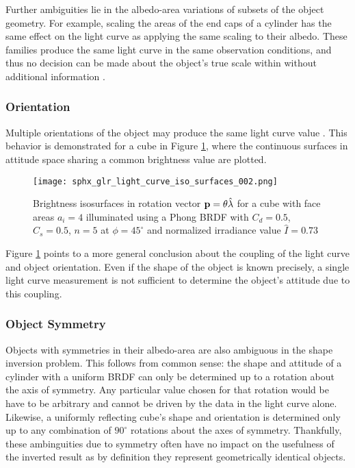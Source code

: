 Further ambiguities lie in the albedo-area variations of subsets of the object geometry. For example, scaling the areas of the end caps of a cylinder has the same effect on the light curve as applying the same scaling to their albedo. These families produce the same light curve in the same observation conditions, and thus no decision can be made about the object's true scale within without additional information \cite{fan2020thesis}.

\subsubsection{Orientation}

Multiple orientations of the object may produce the same light curve value \cite{burton2023attitude}. This behavior is demonstrated for a cube in Figure \ref{fig:brightness_iso}, where the continuous surfaces in attitude space sharing a common brightness value are plotted. 

\begin{figure}[!htb]
  \centering
  \texttt{[image: sphx\_glr\_light\_curve\_iso\_surfaces\_002.png]}
  \caption{Brightness isosurfaces in rotation vector $\mathbf{p} = \theta \hat{\lambda}$ for a cube with face areas $a_i = 4$ illuminated using a Phong BRDF with $C_d=0.5$, $C_s=0.5$, $n=5$ at $\phi=45^\circ$ and normalized irradiance value $\hat{I} = 0.73$}
  \label{fig:brightness_iso}
\end{figure}

Figure \ref{fig:brightness_iso} points to a more general conclusion about the coupling of the light curve and object orientation. Even if the shape of the object is known precisely, a single light curve measurement is not sufficient to determine the object's attitude due to this coupling.

\subsubsection{Object Symmetry}

Objects with symmetries in their albedo-area are also ambiguous in the shape inversion problem. This follows from common sense: the shape and attitude of a cylinder with a uniform BRDF can only be determined up to a rotation about the axis of symmetry. Any particular value chosen for that rotation would be have to be arbitrary and cannot be driven by the data in the light curve alone. Likewise, a uniformly reflecting cube's shape and orientation is determined only up to any combination of $90^\circ$ rotations about the axes of symmetry. Thankfully, these ambinguities due to symmetry often have no impact on the usefulness of the inverted result as by definition they represent geometrically identical objects.

